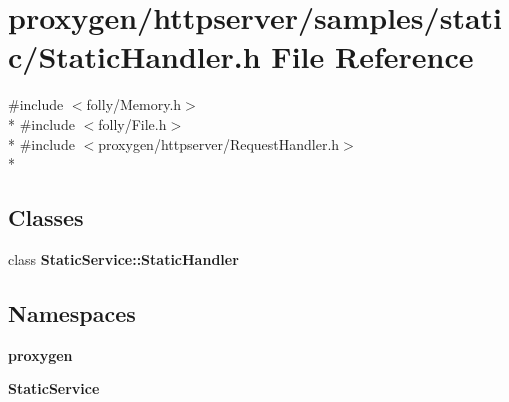 \section{proxygen/httpserver/samples/static/\+Static\+Handler.h File Reference}
\label{StaticHandler_8h}
{\ttfamily \#include $<$folly/\+Memory.\+h$>$}\\*
{\ttfamily \#include $<$folly/\+File.\+h$>$}\\*
{\ttfamily \#include $<$proxygen/httpserver/\+Request\+Handler.\+h$>$}\\*
\subsection*{Classes}
\begin{DoxyCompactItemize}
\item 
class {\bf Static\+Service\+::\+Static\+Handler}
\end{DoxyCompactItemize}
\subsection*{Namespaces}
\begin{DoxyCompactItemize}
\item 
 {\bf proxygen}
\item 
 {\bf Static\+Service}
\end{DoxyCompactItemize}
